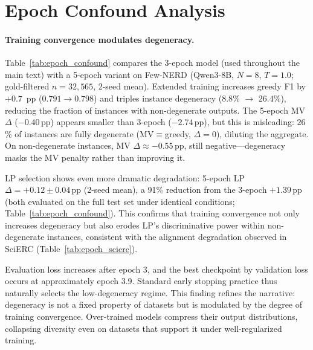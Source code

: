 \section{Epoch Confound Analysis}\label{app:epoch_confound}

\paragraph{Training convergence modulates degeneracy.}
Table~\ref{tab:epoch_confound} compares the 3-epoch model (used throughout the main text) with a 5-epoch variant on Few-NERD (Qwen3-8B, $N{=}8$, $T{=}1.0$; gold-filtered $n{=}32{,}565$, 2-seed mean).
Extended training increases greedy F1 by $+0.7$~pp ($0.791 \to 0.798$) and triples instance degeneracy ($8.8$\% $\to$ $26.4$\%), reducing the fraction of instances with non-degenerate outputs.
The 5-epoch MV $\Delta$ ($-0.40$\,pp) appears smaller than 3-epoch ($-2.74$\,pp), but this is misleading: $26$\% of instances are fully degenerate (MV${\equiv}$greedy, $\Delta{=}0$), diluting the aggregate.
On non-degenerate instances, MV $\Delta{\approx}{-}0.55$\,pp, still negative---degeneracy masks the MV penalty rather than improving it.

LP selection shows even more dramatic degradation: 5-epoch LP $\Delta{=}{+}0.12{\pm}0.04$\,pp (2-seed mean), a 91\% reduction from the 3-epoch $+1.39$\,pp (both evaluated on the full test set under identical conditions; Table~\ref{tab:epoch_confound}). This confirms that training convergence not only increases degeneracy but also erodes LP's discriminative power within non-degenerate instances, consistent with the alignment degradation observed in SciERC (Table~\ref{tab:epoch_scierc}).

Evaluation loss increases after epoch 3, and the best checkpoint by validation loss occurs at approximately epoch 3.9.
Standard early stopping practice thus naturally selects the low-degeneracy regime.
This finding refines the narrative: degeneracy is not a fixed property of datasets but is modulated by the degree of training convergence. Over-trained models compress their output distributions, collapsing diversity even on datasets that support it under well-regularized training.

